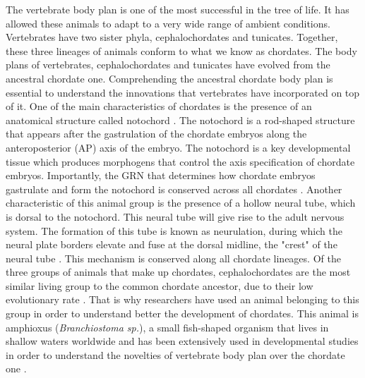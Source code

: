 The vertebrate body plan is one of the most successful in the tree of life. It has allowed these animals to adapt to a very wide range of ambient conditions. Vertebrates have two sister phyla, cephalochordates and tunicates. Together, these three lineages of animals conform to what we know as chordates. The body plans of vertebrates, cephalochordates and tunicates have evolved from the ancestral chordate one. Comprehending the ancestral chordate body plan is essential to understand the innovations that vertebrates have incorporated on top of it.
One of the main characteristics of chordates is the presence of an anatomical structure called notochord \parencite{stemple_structure_2005, bree_development_2018}. The notochord is a rod-shaped structure that appears after the gastrulation of the chordate embryos along the anteroposterior (AP) axis of the embryo. The notochord is a key developmental tissue which produces morphogens that control the axis specification of chordate embryos. Importantly, the GRN that determines how chordate embryos gastrulate and form the notochord is conserved across all chordates \parencite{di_gregorio_chapter_2020}. Another characteristic of this animal group is the presence of a hollow neural tube, which is dorsal to the notochord. This neural tube will give rise to the adult nervous system. The formation of this tube is known as neurulation, during which the neural plate borders elevate and fuse at the dorsal midline, the "crest" of the neural tube \parencite{nikolopoulou_neural_2017, moon_mechanics_2022}. This mechanism is conserved along all chordate lineages. Of the three groups of animals that make up chordates, cephalochordates are the most similar living group to the common chordate ancestor, due to their low evolutionary rate \parencite{delsuc_tunicates_2006}. That is why researchers have used an animal belonging to this group in order to understand better the development of chordates. This animal is amphioxus (\textit{Branchiostoma sp.}), a small fish-shaped organism that lives in shallow waters worldwide and has been extensively used in developmental studies in order to understand the novelties of vertebrate body plan over the chordate one \parencite{putnam_amphioxus_2008, acemel_single_2016,escriva_my_2018, marletaz_amphioxus_2018, aldea_genetic_2019, meister_functions_2022}.

